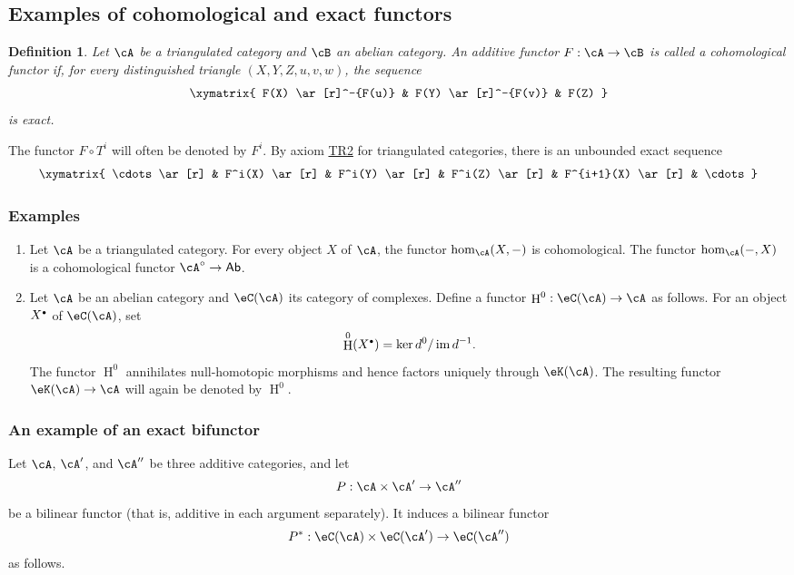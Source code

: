 \documentclass[12pt,oneside,english]{smfbook}
\DeclareMathOperator{\h}{H}
\DeclareMathOperator{\im}{im}
\newtheorem{definition}[subsubsection]{Definition}
\let\oldbullet\bullet
\renewcommand{\bullet}{\textnormal{\tiny$\oldbullet$}}
\begin{document}
\subsection{Examples of cohomological and exact functors}\label{VIII:1-3}

\begin{definition}
Let $\cA$ be a triangulated category and $\cB$ an abelian category. An additive functor $F:\cA\to\cB$ is called a \emph{cohomological functor} if, for every distinguished triangle $(X,Y,Z,u,v,w)$, the sequence
\[\xymatrix{
  F(X) \ar[r]^-{F(u)}
    & F(Y) \ar[r]^-{F(v)}
    & F(Z)
}\]
is exact.
\end{definition}

The functor $F\circ T^i$ will often be denoted by $F^i$. By axiom \hyperlink{VIII:TR2}{TR2} for triangulated categories, there is an unbounded exact sequence
\[\xymatrix{
  \cdots \ar[r]
    & F^i(X) \ar[r]
    & F^i(Y) \ar[r]
    & F^i(Z) \ar[r]
    & F^{i+1}(X) \ar[r]
    & \cdots
}\]

\subsubsection{Examples}\label{VIII:1-3-2}

\begin{enumerate}
  \item Let $\cA$ be a triangulated category. For every object $X$ of $\cA$, the functor $\hom_\cA(X,-)$ is cohomological. The functor $\hom_\cA(-,X)$ is a cohomological functor $\cA^\circ\to\mathsf{Ab}$.
  \item Let $\cA$ be an abelian category and $\eC(\cA)$ its category of complexes. Define a functor $\h^0:\eC(\cA)\to\cA$ as follows. For an object $X^\bullet$ of $\eC(\cA)$, set
    \[
      \h^0(X^\bullet) = \ker d^0 / \im{d^{-1}} \text{.}
    \]
    The functor $\h^0$ annihilates null-homotopic morphisms and hence factors uniquely through $\eK(\cA)$. The resulting functor $\eK(\cA)\to\cA$ will again be denoted by $\h^0$.
\end{enumerate}

\subsubsection{An example of an exact bifunctor}\label{VIII:1-3-3}

Let $\cA$, $\cA'$, and $\cA''$ be three additive categories, and let
\[
  P:\cA\times \cA'\to \cA''
\]
be a bilinear functor (that is, additive in each argument separately). It induces a bilinear functor
\[
  P^\ast:\eC(\cA)\times \eC(\cA') \to \eC(\cA'')
\]
as follows.
\end{document}
